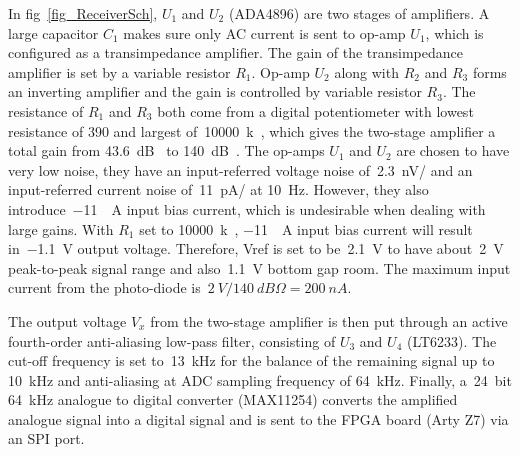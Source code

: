 In fig~\ref{fig_ReceiverSch}, $U_1$ and $U_2$ (ADA4896) are two stages of amplifiers.  A large capacitor $C_1$ makes sure only AC current is sent to op-amp $U_1$, which is configured as a transimpedance amplifier.  The gain of the transimpedance amplifier is set by a variable resistor $R_1$.  Op-amp $U_2$ along with $R_2$ and $R_3$ forms an inverting amplifier and the gain is controlled by variable resistor $R_3$.  The resistance of $R_1$ and $R_3$ both come from a digital potentiometer with  lowest resistance of \qty{390}{\Omega} and largest of~\qty{10000}{k\Omega}, which gives the two-stage amplifier a total gain from \qty{43.6}{dB\Omega} to \qty{140}{dB\Omega}.  The op-amps $U_1$ and $U_2$ are chosen to have very low noise, they have an input-referred voltage noise of~\qty{2.3}{nV/\sqrthz} and an input-referred current noise of~\qty{11}{pA/\sqrthz} at \qty{10}{\Hz}.  However, they also introduce~\qty{-11}{\mu A} input bias current, which is undesirable when dealing with large gains.  With $R_1$ set to \qty{10000}{k\Omega}, \qty{-11}{\mu A} input bias current will result in~\qty{-1.1}{V} output voltage. Therefore, Vref is set to be~\qty{2.1}{V} to have about~\qty{2}{V} peak-to-peak signal range and also~\qty{1.1}{V} bottom gap room.  The maximum input current from the photo-diode is~$\qty{2}{V}/\qty{140}{dB\Omega}=\qty{200}{nA}$.

The output voltage $V_x$ from the two-stage amplifier is then put through an active fourth-order anti-aliasing low-pass filter, consisting of $U_3$ and $U_4$ (LT6233).  The cut-off frequency is set to~\qty{13}{kHz} for the balance of the remaining signal up to \qty{10}{kHz} and anti-aliasing at ADC sampling frequency of \qty{64}{kHz}. Finally, a~\qty{24}{bit} \qty{64}{kHz} analogue to digital converter (MAX11254) converts the amplified analogue signal into a digital signal and is sent to the FPGA board (Arty Z7) via an SPI port.

